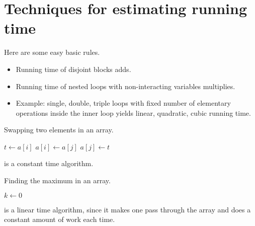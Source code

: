 \chapter{Techniques for estimating running time}

Here are some easy basic rules.
\begin{itemize}
\item Running time of disjoint blocks adds.
\item Running time of nested  loops with non-interacting variables multiplies.
\item Example: single, double, triple loops with fixed number of elementary operations inside the inner loop yields linear, quadratic, cubic running time.
\end{itemize}




\begin{algorithm}[H]
  \caption{Swapping two elements in an array.
    \label{alg:swap}}
\begin{algorithmic}[0]
	\State $t \gets a[i]$
	\State $a[i] \gets a[j]$
	\State $a[j] \gets t$
	\State {}
\EndFunction
\end{algorithmic}
\end{algorithm}
 is a constant time algorithm.


\begin{algorithm}[H]
  \caption{Finding the maximum in an array.
    \label{alg:findmax}}
\begin{algorithmic}[0]
	\State $k \gets 0$ 
		\EndIf
	\EndFor
	\State {}
\EndFunction
\end{algorithmic}
\end{algorithm}
 is a linear time algorithm, since it makes one pass through the array and does a constant amount of work each time.



